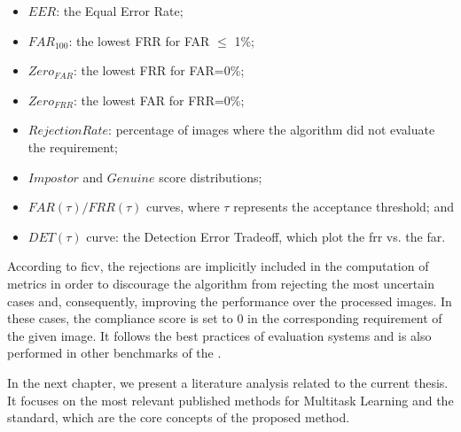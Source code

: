 \begin{itemize}
\item $EER$: the Equal Error Rate;
\item $FAR_{100}$: the lowest FRR for FAR $\leq$ 1\%;
\item $Zero_{FAR}$: the lowest FRR for FAR=0\%;
\item $Zero_{FRR}$: the lowest FAR for FRR=0\%;
\item $Rejection Rate$: percentage of images where the algorithm did not evaluate the requirement;
\item $Impostor$ and $Genuine$ score distributions;
\item $FAR(\tau) / FRR(\tau)$ curves, where $\tau$ represents the acceptance threshold; and
\item $DET(\tau)$ curve: the Detection Error Tradeoff, which plot the \acl{frr} vs. the \acl{far}.
\end{itemize}

According to \acs{ficv}, the rejections are implicitly included in the computation of metrics in order to discourage the algorithm from rejecting the most uncertain cases and, consequently, improving the performance over the processed images. In these cases, the compliance score is set to 0 in the corresponding requirement of the given image. It follows the best practices of evaluation systems and is also performed in other benchmarks of the \fvcongoing.

In the next chapter, we present a literature analysis related to the current thesis. It focuses on the most relevant published methods for Multitask Learning and the \icao standard, which are the core concepts of the proposed method.
